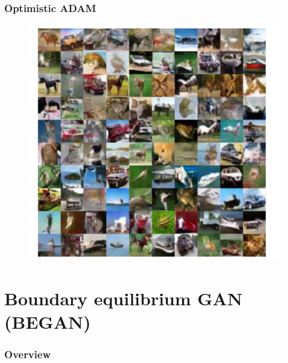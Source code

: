\documentclass{beamer}
\begin{document}
\begin{frame}
\frametitle{Optimistic ADAM}
\begin{figure}
  \includegraphics[width=.7\textwidth]{GAN_optimism.jpg}
\end{figure}
\end{frame}

\section{Boundary equilibrium GAN (BEGAN)}

\begin{frame}
  \frametitle{Overview}
  \tableofcontents[currentsection]
\end{frame}
\end{document}
